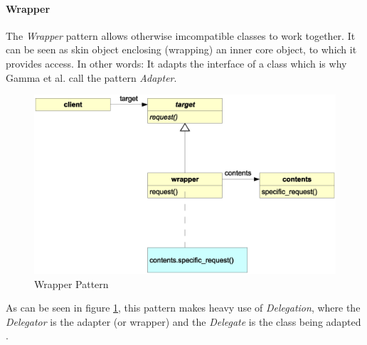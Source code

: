 %
%
%
%
%
%
%

\paragraph{Wrapper}
\label{wrapper_heading}

The \emph{Wrapper} pattern \cite{gamma1995} allows otherwise imcompatible
classes to work together. It can be seen as skin object enclosing (wrapping) an
inner core object, to which it provides access. In other words: It adapts the
interface of a class which is why Gamma et al. call the pattern \emph{Adapter}.

\begin{figure}[ht]
    \begin{center}
        \includegraphics[scale=0.3]{vector/wrapper.eps}
        \caption{Wrapper Pattern}
        \label{wrapper_figure}
    \end{center}
\end{figure}

As can be seen in figure \ref{wrapper_figure}, this pattern makes heavy use of
\emph{Delegation}, where the \emph{Delegator} is the adapter (or wrapper) and
the \emph{Delegate} is the class being adapted \cite{portland}.
